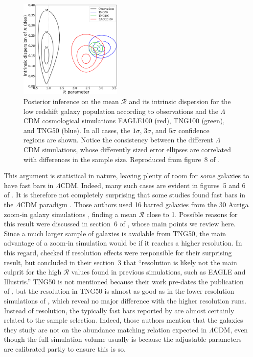 \documentclass[fleqn,usenatbib,useAMS,onecolumn]{mnras} %
\begin{document}
\begin{figure}
	\centering
	\includegraphics[width=0.45\textwidth]{Roshan_2021_bar_speed_Figure_8}
	\caption{Posterior inference on the mean $\mathcal{R}$ and its intrinsic dispersion for the low redshift galaxy population according to observations \citep[black;][]{Cuomo_2020} and the $\Lambda$CDM cosmological simulations EAGLE100 (red), TNG100 (green), and TNG50 (blue). In all cases, the $1\sigma$, $3\sigma$, and $5\sigma$ confidence regions are shown. Notice the consistency between the different $\Lambda$CDM simulations, whose differently sized error ellipses are correlated with differences in the sample size. Reproduced from figure~8 of \citet{Roshan_2021_bar_speed}.}
	\label{Roshan_2021_bar_speed_inference}
\end{figure}

This argument is statistical in nature, leaving plenty of room for \emph{some} galaxies to have fast bars in $\Lambda$CDM. Indeed, many such cases are evident in figures~5 and 6 of \citet{Roshan_2021_bar_speed}. It is therefore not completely surprising that some studies found fast bars in the $\Lambda$CDM paradigm \citep[e.g.][]{Fragkoudi_2021}. Those authors used 16 barred galaxies from the 30 Auriga zoom-in galaxy simulations \citep{Grand_2017}, finding a mean $\mathcal{R}$ close to 1. Possible reasons for this result were discussed in section~6 of \citet{Roshan_2021_bar_speed}, whose main points we review here. Since a much larger sample of galaxies is available from TNG50, the main advantage of a zoom-in simulation would be if it reaches a higher resolution. In this regard, \citet{Fragkoudi_2021} checked if resolution effects were responsible for their surprising result, but concluded in their section~3 that ``resolution is likely not the main culprit for the high $\mathcal{R}$ values found in previous simulations, such as EAGLE and Illustris.'' TNG50 is not mentioned because their work pre-dates the publication of \citet{Roshan_2021_bar_speed}, but the resolution in TNG50 is almost as good as in the lower resolution simulations of \citet{Fragkoudi_2021}, which reveal no major difference with the higher resolution runs. Instead of resolution, the typically fast bars reported by \citet{Fragkoudi_2021} are almost certainly related to the sample selection. Indeed, those authors mention that the galaxies they study are not on the abundance matching relation expected in $\Lambda$CDM, even though the full simulation volume usually is because the adjustable parameters are calibrated partly to ensure this is so.
\end{document}
